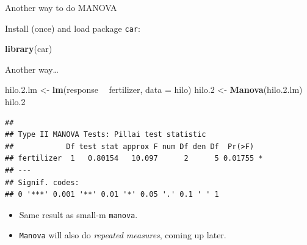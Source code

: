 \documentclass[ignorenonframetext,]{beamer}
\newenvironment{Shaded}{\begin{snugshade}}{\end{snugshade}}
\newcommand{\DataTypeTok}[1]{\textcolor[rgb]{0.13,0.29,0.53}{#1}}
\newcommand{\FloatTok}[1]{\textcolor[rgb]{0.00,0.00,0.81}{#1}}
\newcommand{\KeywordTok}[1]{\textcolor[rgb]{0.13,0.29,0.53}{\textbf{#1}}}
\newcommand{\NormalTok}[1]{#1}
\newcommand{\OperatorTok}[1]{\textcolor[rgb]{0.81,0.36,0.00}{\textbf{#1}}}
\newcommand{\StringTok}[1]{\textcolor[rgb]{0.31,0.60,0.02}{#1}}
\begin{document}
\begin{frame}[fragile]{Another way to do MANOVA}
\protect\hypertarget{another-way-to-do-manova}{}

Install (once) and load package \texttt{car}:

\begin{Shaded}
\begin{Highlighting}[]
\KeywordTok{library}\NormalTok{(car)}
\end{Highlighting}
\end{Shaded}

\end{frame}

\begin{frame}[fragile]{Another way\ldots}
\protect\hypertarget{another-way-1}{}

\begin{Shaded}
\begin{Highlighting}[]
\NormalTok{hilo.}\FloatTok{2.}\NormalTok{lm <-}\StringTok{ }\KeywordTok{lm}\NormalTok{(response }\OperatorTok{~}\StringTok{ }\NormalTok{fertilizer, }\DataTypeTok{data =}\NormalTok{ hilo)}
\NormalTok{hilo}\FloatTok{.2}\NormalTok{ <-}\StringTok{ }\KeywordTok{Manova}\NormalTok{(hilo.}\FloatTok{2.}\NormalTok{lm)}
\NormalTok{hilo}\FloatTok{.2}
\end{Highlighting}
\end{Shaded}

\begin{verbatim}
## 
## Type II MANOVA Tests: Pillai test statistic
##            Df test stat approx F num Df den Df  Pr(>F)  
## fertilizer  1   0.80154   10.097      2      5 0.01755 *
## ---
## Signif. codes:  
## 0 '***' 0.001 '**' 0.01 '*' 0.05 '.' 0.1 ' ' 1
\end{verbatim}

\begin{itemize}
\item
  Same result as small-m \texttt{manova}.
\item
  \texttt{Manova} will also do \emph{repeated measures}, coming up
  later.
\end{itemize}

\end{frame}
\end{document}
